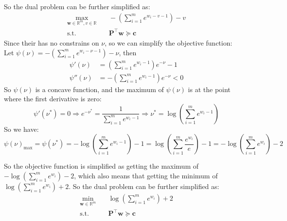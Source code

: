 So the dual problem can be further simplified as:
\begin{align*}
\max_{\pmb w\in\mathbb{R}^m,v\in\mathbb{R}} &\quad -\left(\sum_{i=1}^m e^{w_i-v-1} \right)-v \\
\text{s.t.} &\quad \pmb P^{\top}\pmb w \succeq \pmb c
\end{align*}
Since their has no constrains on $\nu$, so we can simplify the objective function: \\
Let $\psi(\nu) = -\left(\sum\limits_{i=1}^m e^{w_i-\nu-1} \right) - \nu$, then
\begin{align*}
\psi'(\nu) &= \left(\sum\limits_{i=1}^m e^{w_i-1} \right)e^{-\nu} - 1 \\
\psi''(\nu) &= -\left(\sum\limits_{i=1}^m e^{w_i-1}\right)e^{-\nu} < 0
\end{align*}
So $\psi(\nu)$ is a concave function, and the maximum of $\psi(\nu)$ is at the point where the first derivative is zero:
$$\psi'(\nu^*) = 0 \Rightarrow e^{-\nu^*} = \frac{1}{\sum\limits_{i=1}^m e^{w_i-1}} \Rightarrow \nu^* = \log\left(\sum\limits_{i=1}^m e^{w_i-1}\right)$$
So we have:
$$\psi(\nu)_{\max} = \psi(\nu^*) = -\log\left(\sum\limits_{i=1}^m e^{w_i-1}\right) - 1 = \log\left(\sum\limits_{i=1}^m \dfrac{e^{w_i}}{e}\right) - 1 = -\log\left(\sum\limits_{i=1}^m e^{w_i}\right) - 2$$

So the objective function is simplified as getting the maximum of $-\log\left(\sum\limits_{i=1}^m e^{w_i}\right) - 2$, which also means that getting the minimum of $\log\left(\sum\limits_{i=1}^m e^{w_i}\right) + 2$.
So the dual problem can be further simplified as:
\begin{align*}
\min_{\pmb w\in\mathbb{R}^m} &\quad \log\left(\sum_{i=1}^m e^{w_i}\right) + 2 \\
\text{s.t.} &\quad \pmb P^{\top}\pmb w \succeq \pmb c
\end{align*}

\newpage
